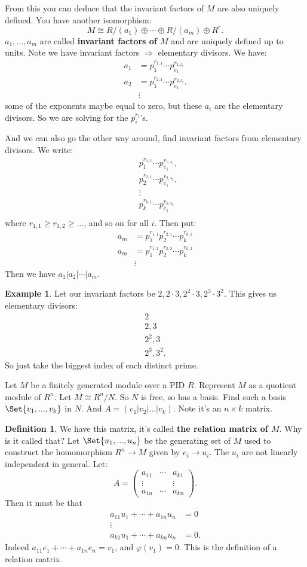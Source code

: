 \documentclass[9pt,reqno,twoside]{amsbook}
\theoremstyle{plain}
\numberwithin{section}{chapter}
\numberwithin{equation}{chapter}
\theoremstyle{definition}
\newtheorem{Def}[theorem]{Definition}
\newtheorem{Ex}[theorem]{Example}
\theoremstyle{remark}
\theoremstyle{plain}
\newcommand{\bee}{\begin{equation}\begin{aligned}}
\newcommand{\eee}{\end{aligned}\end{equation}}
\newcommand{\lpar}{\left(}
\newcommand{\rpar}{\right)}
\renewcommand{\geq}{\geqslant}
\renewcommand{\phi}{\varphi}
\begin{document}
From this you can deduce that the invariant factors of $M$ are also uniquely defined. You have another isomorphism:
$$
M \cong R/(a_1) \oplus \cdots \oplus R/(a_m) \oplus R^r.
$$
$a_1,...,a_m$ are called \textbf{invariant factors of $M$} and are uniquely defined up to units. Note we have invariant factors $\Rightarrow$ elementary divisors. We have:
\bee
a_1  &=p_1^{r_{1,1}}\cdots p_{e_1}^{r_{1,l_1}}\\
a_2  &=p_1^{r_{2,1}}\cdots p_{e_1}^{r_{2,l_2}}.\\
&\vdots
\eee
some of the exponents maybe equal to zero, but these $a_i$ are the elementary divisors. So we are solving for the $p_i^{r_i}$'s. 

And we can also go the other way around, find invariant factors from elementary divisors. We write:
\bee
&p_1^{r_{1,1}}\cdots p_{e_1}^{r_{1,s_1}},\\
&p_2^{r_{2,1}}\cdots p_{e_1}^{r_{2,s_2}},\\
&\vdots\\
&p_k^{r_{k,1}}\cdots p_{e_1}^{r_{k,s_k}}\\
\eee
where $r_{1,1} \geq r_{1,2} \geq ...$, and so on for all $i$. Then put:
\bee
a_m &= p_1^{r_{1,1}}p_2^{r_{2,1}}\cdots p_k^{r_{k,1}}\\
a_m &= p_1^{r_{1,2}}p_2^{r_{2,2}}\cdots p_k^{r_{k,2}}\\
&\vdots
\eee
Then we have $a_1|a_2|\cdots|a_m$. 

\begin{Ex}
Let our invariant factors be $2,2\cdot 3,2^2\cdot 3,2^3\cdot 3^2$. This gives us elementary divisors:
\bee
2\\
2,3\\
2^2,3\\
2^3,3^2.
\eee
So just take the biggest index of each distinct prime. 
\end{Ex}

Let $M$ be a finitely generated module over a PID $R$. Represent $M$ as a quotient module of $R^n$. Let $M \cong R^n/N$. So $N$ is free, so has a basis. Find such a basis $\Set{v_1,...,v_k}$ in $N$. And $A = (v_1|v_2|...|v_k)$. Note it's an $n \times k$ matrix. 
\begin{Def}
We have this matrix, it's called \textbf{the relation matrix of $M$}. 
Why is it called that? Let $\Set{u_1,...,u_n}$ be the generating set of $M$ used to construct the homomorphism $R^n \to M$ given by $e_i \to u_i$. The $u_i$ are not linearly independent in general. Let:
$$
A = \lpar 
\begin{matrix}
a_{11} & \cdots & a_{k1}\\
\vdots & & \vdots\\
a_{1n} & \cdots & a_{kn}
\end{matrix} \rpar. 
$$
Then it must be that 
\bee
a_{11}u_1 + \cdots + a_{1n}u_n &= 0\\
\vdots \\
a_{k1}u_1 + \cdots + a_{kn}u_n &= 0.
\eee
Indeed $a_{11}e_1 + \cdots + a_{1n}e_n  =v_1$, and $\phi(v_1)  =0$. This is the definition of a relation matrix. 
\end{Def}
\end{document}
